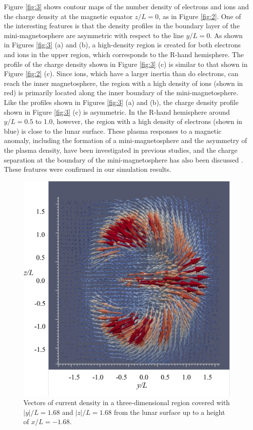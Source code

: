 \documentclass[draft,jgrga]{agutex2015}
\begin{document}
\begin{article}
Figure \ref{fig:3} shows contour maps of the number density of 
electrons and ions and the charge density 
at the magnetic equator $z/L=0$, as in 
Figure \ref{fig:2}. 
One of the interesting features is that the density profiles 
in the boundary layer of the mini-magnetosphere
are asymmetric with respect to the line $y/L =0$.
As shown in Figures \ref{fig:3} (a) and (b), a high-density region is created 
for both electrons and ions in the upper region,
which corresponds to the R-hand hemisphere. 
The profile of the charge density shown in Figure \ref{fig:3} (c) is 
similar to that shown in Figure \ref{fig:2} (c). 
Since ions, which have a larger inertia than do electrons, can reach the inner magnetosphere, the region with a 
high density of ions (shown in red) is primarily located
along the inner boundary of the mini-magnetosphere. 
Like the profiles shown in Figures \ref{fig:3} (a) and (b), 
the charge density profile shown in Figure \ref{fig:3} (c) is asymmetric. 
In the R-hand hemisphere around $y/L = 0.5$ to 1.0, however, the region with a
high density of electrons (shown in blue) is close to the lunar surface. 
These plasma responses to a magnetic anomaly, 
including the formation of a mini-magnetosphere and 
the asymmetry of the plasma density, have been investigated 
in previous studies, and the charge separation at the boundary of the mini-magnetosphere has also been discussed
 \citep[e.g.,][]{Harnett2002,Kallio2012,Poppe2012a,Deca2014,Deca2015}.
These features were confirmed in our simulation results.


\begin{figure}[h]
\centering
\noindent\includegraphics[width=12cm]{./figures/Fig_4_bb-crop.pdf}
\caption{
Vectors of current density in a three-dimensional region 
covered with $|y|/L=1.68$ and $|z|/L=1.68$ 
from the lunar surface up to a height of $x/L = -1.68$.
}
\label{fig:4}
\end{figure}


\end{article}
\end{document}
